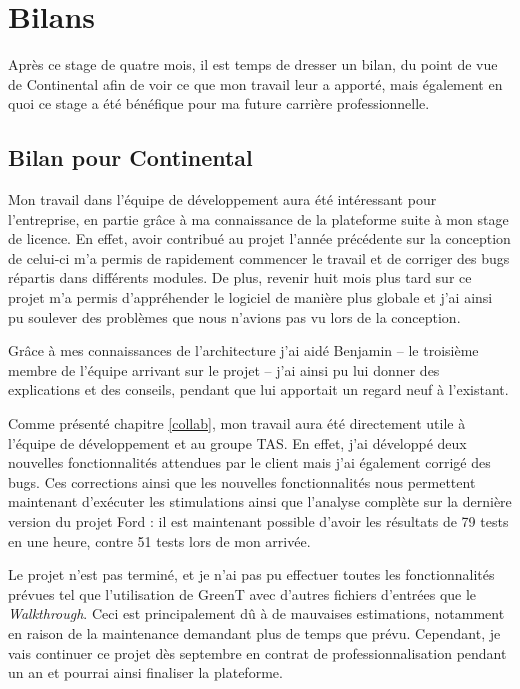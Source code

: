 \chapter{Bilans}
\putminitoc

Après ce stage de quatre mois, il est temps de dresser un bilan, du point de vue de Continental afin de voir ce que mon travail leur a apporté, mais également en quoi ce stage a été bénéfique pour ma future carrière professionnelle.

\section{Bilan pour Continental}
Mon travail dans l'équipe de développement aura été intéressant pour l'entreprise, en partie grâce à ma connaissance de la plateforme suite à mon stage de licence. En effet, avoir contribué au projet l'année précédente sur la conception de celui-ci m'a permis de rapidement commencer le travail et de corriger des bugs répartis dans différents modules. De plus, revenir huit mois plus tard sur ce projet m'a permis d'appréhender le logiciel de manière plus globale et j'ai ainsi pu soulever des problèmes que nous n'avions pas vu lors de la conception.

Grâce à mes connaissances de l'architecture j'ai aidé Benjamin  -- le troisième membre de l'équipe arrivant sur le projet -- j'ai ainsi pu lui donner des explications et des conseils, pendant que lui apportait un regard neuf à l'existant.

Comme présenté chapitre \ref{collab}, mon travail aura été directement utile à l'équipe de développement et au groupe TAS. En effet, j'ai développé deux nouvelles fonctionnalités attendues par le client mais j'ai également corrigé des bugs. Ces corrections ainsi que les nouvelles fonctionnalités nous permettent maintenant d'exécuter les stimulations ainsi que l'analyse complète sur la dernière version du projet Ford : il est maintenant possible d'avoir les résultats de 79 tests en une heure, contre 51 tests lors de mon arrivée.

Le projet n'est pas terminé, et je n'ai pas pu effectuer toutes les fonctionnalités prévues tel que l'utilisation de GreenT avec d'autres fichiers d'entrées que le \textit{Walkthrough}. Ceci est principalement dû à de mauvaises estimations, notamment en raison de la maintenance demandant plus de temps que prévu. Cependant, je vais continuer ce projet dès septembre en contrat de professionnalisation pendant un an et pourrai ainsi finaliser la plateforme.

